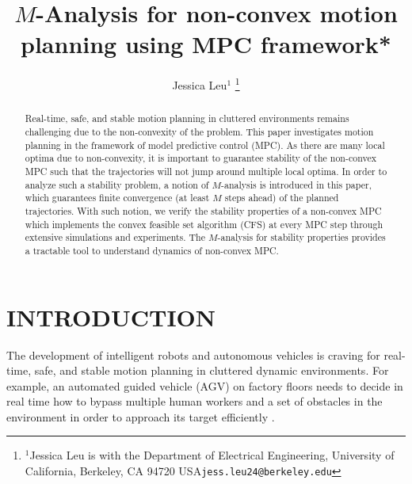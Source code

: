 \documentclass[letterpaper, 10 pt, conference]{ieeeconf}  %
\title{\LARGE \bf
$M$-Analysis for non-convex motion planning using MPC framework*
}
\author{ Jessica Leu$^{1}$%
\thanks{$^{1}$Jessica Leu is with the Department of Electrical Engineering, University of California,
Berkeley, CA 94720 USA{\tt\small jess.leu24@berkeley.edu}}%
}
\begin{document}
\maketitle
\thispagestyle{empty}
\pagestyle{empty}


\begin{abstract}

Real-time, safe, and stable motion planning in cluttered environments remains challenging due to the non-convexity of the problem. This paper investigates motion planning in the framework of model predictive control (MPC). As there are many local optima due to non-convexity, it is important to guarantee stability of the non-convex MPC such that the trajectories will not jump around multiple local optima. In order to analyze such a stability problem, a notion of $M$-analysis is introduced in this paper, which guarantees finite convergence (at least $M$ steps ahead) of the planned trajectories. With such notion, we verify the stability properties of a non-convex MPC which implements the convex feasible set algorithm (CFS) at every MPC step through extensive simulations and experiments. The $M$-analysis for stability properties provides a tractable tool to understand dynamics of non-convex MPC.
\end{abstract}


\section{INTRODUCTION}

The development of intelligent robots and autonomous vehicles is craving for real-time, safe, and stable motion planning in cluttered dynamic environments. For example, an automated guided vehicle (AGV) on factory floors \cite{wu2004modeling} needs to decide in real time how to bypass multiple human workers and a set of obstacles in the environment in order to approach its target efficiently \cite{wang2009autonomous,oleari2014industrial}. 
\end{document}
